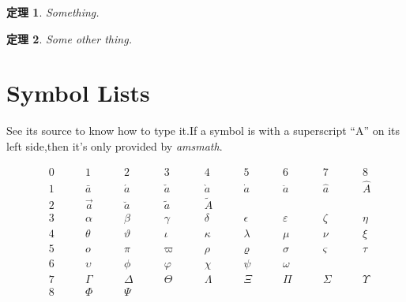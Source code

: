 \documentclass[a4paper]{report}
\newtheorem{FirstTheorem}{定理}
\newtheorem{NextTheorem}[FirstTheorem]{定理}
\begin{document}
\begin{FirstTheorem}
Something.
\end{FirstTheorem}

\begin{NextTheorem}
Some other thing.
\end{NextTheorem}

\section{Symbol Lists}
\newcommand{\qqq}{\qquad&}
See its source to know how to type it.If a symbol is with a
superscript ``A'' on its left side,then it's only provided by
\emph{amsmath}.

\begin{displaymath}
\begin{aligned}
& 0 \qqq 1 \qqq 2 \qqq 3 \qqq 4 \qqq 5 \qqq 6 \qqq 7 \qqq 8\\
& 1 \qqq \bar{a} \qqq \acute{a} \qqq \check{a} \qqq \grave{a} \qqq
\dot{a} \qqq \ddot{a} \qqq \hat{a} \qqq \widehat{A}\\
& 2 \qqq \vec{a} \qqq \breve{a} \qqq \tilde{a} \qqq \widetilde{A}
\qqq \\
& 3 \qqq \alpha \qqq \beta \qqq \gamma \qqq \delta \qqq
\epsilon \qqq \varepsilon \qqq \zeta \qqq \eta\\
& 4 \qqq \theta \qqq \vartheta \qqq \iota \qqq \kappa \qqq
\lambda \qqq \mu \qqq \nu \qqq \xi \\
& 5  \qqq o \qqq \pi \qqq \varpi \qqq \rho \qqq \varrho \qqq \sigma
\qqq \varsigma \qqq \tau\\
& 6 \qqq \upsilon \qqq \phi \qqq \varphi \qqq \chi \qqq \psi \qqq
\omega \\
& 7 \qqq \Gamma \qqq \Delta \qqq \Theta \qqq \Lambda \qqq \Xi \qqq
\Pi \qqq \Sigma \qqq \Upsilon \\
& 8 \qqq \Phi \qqq \Psi
\end{aligned}
\end{displaymath}
\end{document}
